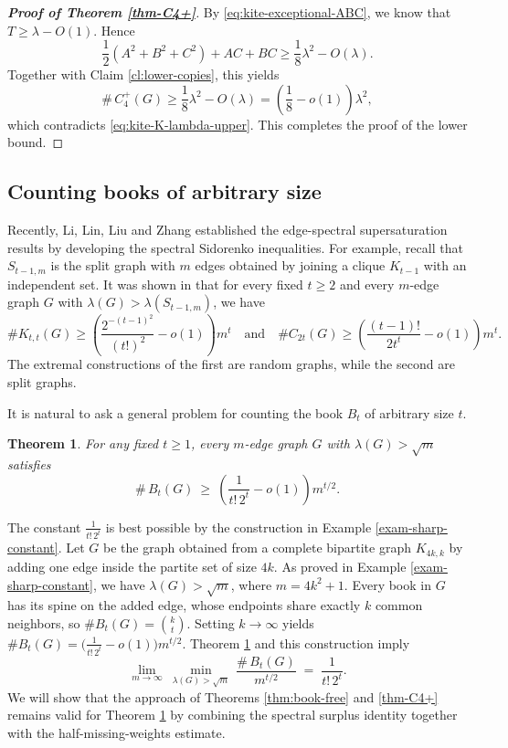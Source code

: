 \documentclass[11pt,a4paper]{article}
\newtheorem{theorem}{Theorem}[section]
\theoremstyle{definition}
\theoremstyle{plain}
\renewcommand{\ge}{\geqslant}
\begin{document}
\begin{proof}[{\bf Proof of Theorem \ref{thm-C4+}}]
By \eqref{eq:kite-exceptional-ABC}, we know that \(T\ge\lambda-O(1)\).  Hence
\[
        \frac12(A^2+B^2+C^2)+AC+BC
        \ge
        \frac18\lambda^2-O(\lambda).
\]
Together with Claim \ref{cl:lower-copies}, this yields
\[
      \texttt{\#} \,C_4^+(G)  \ge \frac18\lambda^2-O(\lambda)
        =
        \left(\frac18-o(1)\right)\lambda^2, 
\]
which contradicts \eqref{eq:kite-K-lambda-upper}. This completes the proof of the lower
bound. 
\end{proof}




\subsection{Counting books of arbitrary size} 

\label{sec:large-books}

Recently, 
Li, Lin, Liu and Zhang \cite{LLLZ2026} established the edge-spectral 
supersaturation results by developing the spectral Sidorenko inequalities. For example, recall that $S_{t-1,m}$ is the split graph with $m$ edges obtained by joining a clique $K_{t-1}$ with an independent set. It was shown in \cite{LLLZ2026} that for every fixed $t\ge 2$ and every $m$-edge graph $G$ with $\lambda(G)>\lambda(S_{t-1,m})$, we have 
$$\texttt{\#} K_{t,t}(G)
        \ge
        \left(\frac{2^{-(t-1)^2}}{(t!)^2}-o(1)\right)m^t \quad \text{and}\quad
 \texttt{\#}C_{2t}(G)
        \ge
        \left(\frac{(t-1)!}{2t^t}-o(1)\right)m^t.$$
The extremal constructions of the first are random graphs, while the second are split graphs. 

It is natural to ask a general problem for counting the book $B_t$ of arbitrary size $t$. 


\begin{theorem}\label{thm:Bt-count}
For any fixed $t\ge 1$, 
every $m$-edge graph $G$ with 
$\lambda(G)>\sqrt m$ satisfies
\[
   \texttt{\#}\,B_t(G)\ \ge\ \left(\frac{1}{t!\,2^{t}}-o(1)\right)m^{t/2}. 
\]
\end{theorem}

The constant $\tfrac{1}{t!\,2^{t}}$ is best possible by the construction in Example \ref{exam-sharp-constant}. Let $G$ be the graph obtained from a complete bipartite graph $K_{4k,k}$ by adding one edge inside the partite set of size $4k$. As proved in Example \ref{exam-sharp-constant}, we have $\lambda (G)> \sqrt{m}$, where $m=4k^2+1$. 
Every book in $G$ has its spine on the added edge, whose endpoints share exactly $k$ common neighbors, so $\texttt{\#}B_t(G)=\binom{k}{t}$. Setting $k\to \infty$  yields $\texttt{\#} B_t(G)=\bigl(\tfrac{1}{t!\,2^{t}}-o(1)\bigr)m^{t/2}$. 
 Theorem \ref{thm:Bt-count} and this construction  imply  
\[
   \lim_{m\to\infty}\ \min_{\lambda(G)>\sqrt m}\
   \frac{\texttt{\#}\,B_t(G)}{m^{t/2}}\;=\;\frac{1}{t!\,2^{t}} .
\]
 We will show that the approach of Theorems \ref{thm:book-free} and \ref{thm-C4+} remains valid  for Theorem \ref{thm:Bt-count} by combining the spectral surplus identity together with the half-missing-weights estimate. 
\end{document}
